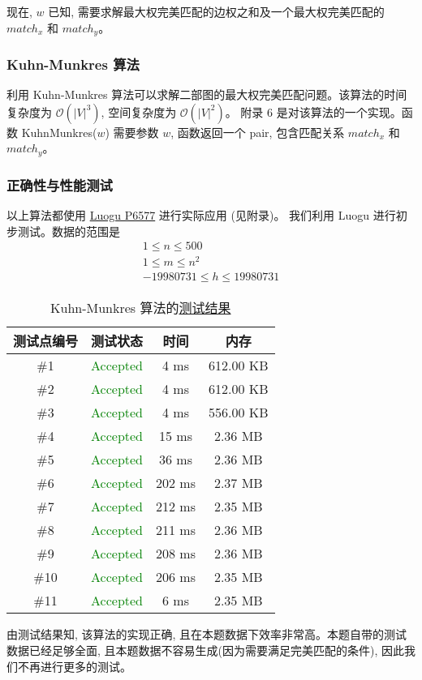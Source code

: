 现在, $w$ 已知, 需要求解最大权完美匹配的边权之和及一个最大权完美匹配的 $match_x$ 和 $match_y$。
\subsubsection{Kuhn-Munkres 算法}
利用 Kuhn-Munkres 算法可以求解二部图的最大权完美匹配问题。该算法的时间复杂度为 $\mathcal{O}(\left|V\right|^3)$, 空间复杂度为 $\mathcal{O}(\left|V\right|^2)$。
附录 6 是对该算法的一个实现。函数 KuhnMunkres($w$) 需要参数 $w$, 函数返回一个 pair, 包含匹配关系 $match_x$ 和 $match_y$。
\subsubsection{正确性与性能测试}
以上算法都使用 \href{https://www.luogu.com.cn/problem/P6577}{Luogu P6577} 进行实际应用 (见附录)。
我们利用 Luogu 进行初步测试。数据的范围是
$$
\begin{gathered}
	1 \leq n \leq 500 \\
	1 \leq m \leq n^2 \\
	-19980731 \leq h \leq 19980731
\end{gathered}
$$

\begin{table}[H]
	\centering
	\caption{Kuhn-Munkres 算法的\href{https://www.luogu.com.cn/record/195173111}{测试结果}}
	\label{tab:kuhn_munkres_test_results}
	\linewidth
	\begin{tabular}{cccc}
		\toprule
		\textbf{测试点编号} & \textbf{测试状态} & \textbf{时间} & \textbf{内存} \\
		\midrule
		\#1 & \textcolor{green}{Accepted} & 4 ms & 612.00 KB \\
		\#2 & \textcolor{green}{Accepted} & 4 ms & 612.00 KB \\
		\#3 & \textcolor{green}{Accepted} & 4 ms & 556.00 KB \\
		\#4 & \textcolor{green}{Accepted} & 15 ms & 2.36 MB \\
		\#5 & \textcolor{green}{Accepted} & 36 ms & 2.36 MB \\
		\#6 & \textcolor{green}{Accepted} & 202 ms & 2.37 MB \\
		\#7 & \textcolor{green}{Accepted} & 212 ms & 2.35 MB \\
		\#8 & \textcolor{green}{Accepted} & 211 ms & 2.36 MB \\
		\#9 & \textcolor{green}{Accepted} & 208 ms & 2.36 MB \\
		\#10 & \textcolor{green}{Accepted} & 206 ms & 2.35 MB \\
		\#11 & \textcolor{green}{Accepted} & 6 ms & 2.35 MB \\
		\bottomrule
	\end{tabular}
\end{table}

由测试结果知, 该算法的实现正确, 且在本题数据下效率非常高。本题自带的测试数据已经足够全面, 且本题数据不容易生成(因为需要满足完美匹配的条件), 因此我们不再进行更多的测试。
